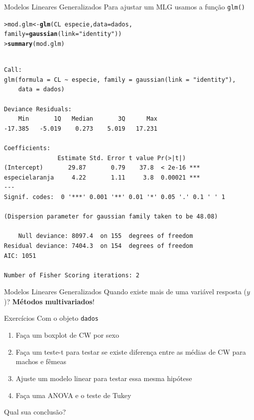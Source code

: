 \documentclass[10pt]{beamer}\usepackage[]{graphicx}\usepackage[]{color}
\makeatletter
\newcommand{\hlstr}[1]{\textcolor[rgb]{0.282,0.239,0.545}{#1}}%
\newcommand{\hlopt}[1]{\textcolor[rgb]{0,0,0}{#1}}%
\newcommand{\hlstd}[1]{\textcolor[rgb]{0.345,0.345,0.345}{#1}}%
\newcommand{\hlkwb}[1]{\textcolor[rgb]{0.69,0.353,0.396}{#1}}%
\newcommand{\hlkwc}[1]{\textcolor[rgb]{0.333,0.667,0.333}{#1}}%
\newcommand{\hlkwd}[1]{\textcolor[rgb]{0.282,0.239,0.545}{\textbf{#1}}}%
\newenvironment{kframe}{%
 \def\at@end@of@kframe{}%
 \ifinner\ifhmode%
  \def\at@end@of@kframe{\end{minipage}}%
  \begin{minipage}{\columnwidth}%
 \fi\fi%
 \def\FrameCommand##1{\hskip\@totalleftmargin \hskip-\fboxsep
 \colorbox{shadecolor}{##1}\hskip-\fboxsep
     \hskip-\linewidth \hskip-\@totalleftmargin \hskip\columnwidth}%
 \MakeFramed {\advance\hsize-\width
   \@totalleftmargin\z@ \linewidth\hsize
   \@setminipage}}%
 {\par\unskip\endMakeFramed%
 \at@end@of@kframe}
\newenvironment{knitrout}{}{} %
\makeatother
\begin{document}
\begin{frame}[fragile=singleslide]{Modelos Lineares Generalizados}
Para ajustar um MLG usamos a função \texttt{glm()}
\begin{knitrout}\footnotesize
{}\color{fgcolor}\begin{kframe}
\begin{alltt}
\hlstd{> }\hlstd{mod.glm} \hlkwb{<-} \hlkwd{glm}\hlstd{(CL} \hlopt{~} \hlstd{especie,} \hlkwc{data} \hlstd{= dados,}
\hlstd{  }               \hlkwc{family} \hlstd{=} \hlkwd{gaussian}\hlstd{(}\hlkwc{link} \hlstd{=} \hlstr{"identity"}\hlstd{))}
\hlstd{> }\hlkwd{summary}\hlstd{(mod.glm)}
\end{alltt}
\begin{verbatim}

Call:
glm(formula = CL ~ especie, family = gaussian(link = "identity"), 
    data = dados)

Deviance Residuals: 
    Min       1Q   Median       3Q      Max  
-17.385   -5.019    0.273    5.019   17.231  

Coefficients:
               Estimate Std. Error t value Pr(>|t|)    
(Intercept)       29.87       0.79    37.8  < 2e-16 ***
especielaranja     4.22       1.11     3.8  0.00021 ***
---
Signif. codes:  0 '***' 0.001 '**' 0.01 '*' 0.05 '.' 0.1 ' ' 1

(Dispersion parameter for gaussian family taken to be 48.08)

    Null deviance: 8097.4  on 155  degrees of freedom
Residual deviance: 7404.3  on 154  degrees of freedom
AIC: 1051

Number of Fisher Scoring iterations: 2
\end{verbatim}
\end{kframe}
\end{knitrout}

\end{frame}

\begin{frame}[fragile=singleslide]{Modelos Lineares Generalizados}
Quando existe mais de uma variável resposta ($y$)? \textbf{Métodos
  multivariados}!
\end{frame}

\begin{frame}[fragile=singleslide]{Exercícios}
Com o objeto \texttt{dados}
\begin{enumerate}
\item Faça um boxplot de CW por sexo
\item Faça um teste-t para testar se existe diferença entre as médias de
  CW para machos e fêmeas
\item Ajuste um modelo linear para testar essa mesma hipótese
\item Faça uma ANOVA e o teste de Tukey
\end{enumerate}
Qual sua conclusão?
\end{frame}
\end{document}
